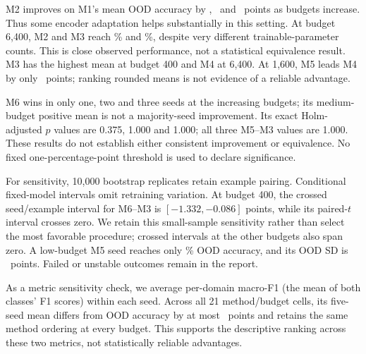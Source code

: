 \documentclass[a4paper,10pt]{article}
\begin{document}
\begin{center}

\label{tab:accuracy}
\end{center}
M2 improves on M1's mean OOD accuracy by \MtwoMinusMoneLow, \MtwoMinusMoneMid\ and \MtwoMinusMoneHigh\ points as budgets increase. Thus some encoder adaptation helps substantially in this setting. At budget 6,400, M2 and M3 reach \OODPartialHigh\% and \OODFullHigh\%, despite very different trainable-parameter counts. This is close observed performance, not a statistical equivalence result. M3 has the highest mean at budget 400 and M4 at 6,400. At 1,600, M5 leads M4 by only \LoRAvsLPMid\ points; ranking rounded means is not evidence of a reliable advantage.

\begin{center}

\label{tab:paired}
\end{center}
M6 wins in only one, two and three seeds at the increasing budgets; its medium-budget positive mean is not a majority-seed improvement. Its exact Holm-adjusted $p$ values are 0.375, 1.000 and 1.000; all three M5--M3 values are 1.000. These results do not establish either consistent improvement or equivalence. No fixed one-percentage-point threshold is used to declare significance.

For sensitivity, 10,000 bootstrap replicates retain example pairing. Conditional fixed-model intervals omit retraining variation. At budget 400, the crossed seed/example interval for M6--M3 is $[-1.332,-0.086]$ points, while its paired-$t$ interval crosses zero. We retain this small-sample sensitivity rather than select the most favorable procedure; crossed intervals at the other budgets also span zero. A low-budget M5 seed reaches only \LoRAFailure\% OOD accuracy, and its OOD SD is \LoRASDLow\ points. Failed or unstable outcomes remain in the report.

As a metric sensitivity check, we average per-domain macro-F1 (the mean of both classes' F1 scores) within each seed. Across all 21 method/budget cells, its five-seed mean differs from OOD accuracy by at most \FoneMaxGap\ points and retains the same method ordering at every budget. This supports the descriptive ranking across these two metrics, not statistically reliable advantages.
\end{document}

